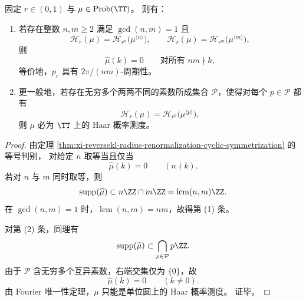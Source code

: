 \begin{corollary}\label{cor:xi-reversekl-cyclic-equality-prime-tower-rigidity}
固定 \(r\in(0,1)\) 与 \(\mu\in\mathrm{Prob}(\TT)\)。
则有：
\begin{enumerate}
  \item 若存在整数 \(n,m\ge 2\) 满足 \(\gcd(n,m)=1\) 且
  \[
  \mathcal H_r(\mu)=\mathcal H_{r^n}\!\bigl(\mu^{\langle n\rangle}\bigr),
  \qquad
  \mathcal H_r(\mu)=\mathcal H_{r^m}\!\bigl(\mu^{\langle m\rangle}\bigr),
  \]
  则
  \[
  \widehat\mu(k)=0
  \qquad\text{对所有 }nm\nmid k,
  \]
  等价地，\(p_r\) 具有 \(2\pi/(nm)\)-周期性。
  \item 更一般地，若存在无穷多个两两不同的素数所成集合 \(\mathcal P\)，使得对每个 \(p\in\mathcal P\) 都有
  \[
  \mathcal H_r(\mu)=\mathcal H_{r^p}\!\bigl(\mu^{\langle p\rangle}\bigr),
  \]
  则 \(\mu\) 必为 \(\TT\) 上的 Haar 概率测度。
\end{enumerate}
\end{corollary}
\begin{proof}
由定理 \ref{thm:xi-reversekl-radius-renormalization-cyclic-symmetrization} 的等号判别，
对给定 \(n\) 取等当且仅当
\[
\widehat\mu(k)=0\qquad(n\nmid k).
\]
若对 \(n\) 与 \(m\) 同时取等，则
\[
\operatorname{supp}(\widehat\mu)\subset n\ZZ\cap m\ZZ=\operatorname{lcm}(n,m)\ZZ.
\]
在 \(\gcd(n,m)=1\) 时，\(\operatorname{lcm}(n,m)=nm\)，故得第 (1) 条。

对第 (2) 条，同理有
\[
\operatorname{supp}(\widehat\mu)\subset \bigcap_{p\in\mathcal P} p\ZZ.
\]
由于 \(\mathcal P\) 含无穷多个互异素数，右端交集仅为 \(\{0\}\)，故
\[
\widehat\mu(k)=0\qquad(k\neq 0).
\]
由 Fourier 唯一性定理，\(\mu\) 只能是单位圆上的 Haar 概率测度。
证毕。
\end{proof}

